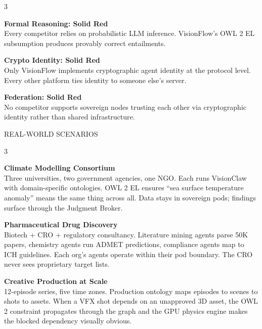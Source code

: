 \documentclass[10pt,a4paper]{article}
\newcommand{\sectiontag}[1]{%
  \vspace{6pt}%
  {\footnotesize\color{gold}\MakeUppercase{#1}}\\[-1pt]%
}
\begin{document}
\vspace{4pt}

\begin{multicols}{3}
\raggedright
{\small
\textbf{\color{emerald}Formal Reasoning: Solid Red}\\
Every competitor relies on probabilistic LLM inference. VisionFlow's OWL 2 EL subsumption produces provably correct entailments.

\columnbreak

\textbf{\color{emerald}Crypto Identity: Solid Red}\\
Only VisionFlow implements cryptographic agent identity at the protocol level. Every other platform ties identity to someone else's server.

\columnbreak

\textbf{\color{emerald}Federation: Solid Red}\\
No competitor supports sovereign nodes trusting each other via cryptographic identity rather than shared infrastructure.
}
\end{multicols}

\sectiontag{Real-World Scenarios}

\begin{multicols}{3}
\raggedright

{\small
\textbf{\color{cyan}Climate Modelling Consortium}\\
Three universities, two government agencies, one NGO. Each runs VisionClaw with domain-specific ontologies. OWL 2 EL ensures ``sea surface temperature anomaly'' means the same thing across all. Data stays in sovereign pods; findings surface through the Judgment Broker.

\columnbreak

\textbf{\color{emerald}Pharmaceutical Drug Discovery}\\
Biotech + CRO + regulatory consultancy. Literature mining agents parse 50K papers, chemistry agents run ADMET predictions, compliance agents map to ICH guidelines. Each org's agents operate within their pod boundary. The CRO never sees proprietary target lists.

\columnbreak

\textbf{\color{gold}Creative Production at Scale}\\
12-episode series, five time zones. Production ontology maps episodes to scenes to shots to assets. When a VFX shot depends on an unapproved 3D asset, the OWL 2 constraint propagates through the graph and the GPU physics engine makes the blocked dependency visually obvious.
}
\end{multicols}
\end{document}
